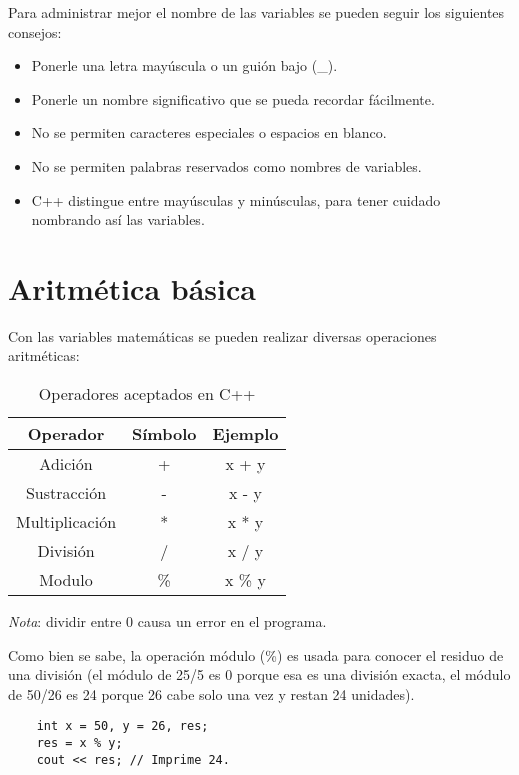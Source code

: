 Para administrar mejor el nombre de las variables se pueden seguir los siguientes consejos:
\begin{itemize}
    \item Ponerle una letra mayúscula o un guión bajo (\_).
    \item Ponerle un nombre significativo que se pueda recordar fácilmente.
    \item No se permiten caracteres especiales o espacios en blanco.
    \item No se permiten palabras reservados como nombres de variables.
    \item C++ distingue entre mayúsculas y minúsculas, para tener cuidado nombrando así las variables.
\end{itemize}



\section{Aritmética básica}

Con las variables matemáticas se pueden realizar diversas operaciones aritméticas:
\begin{table}[H]
    \begin{center}
        \caption{Operadores aceptados en C++}
        \label{tab: 1}
        \begin{tabular}{c c c}
            \hline
            \textbf{Operador}&\textbf{Símbolo}&\textbf{Ejemplo} \\
            \hline
            Adición         & +     & x + y \\
            Sustracción     & -     & x - y \\
            Multiplicación  & *     & x * y \\
            División        & /     & x / y \\
            Modulo          & \%    & x \% y \\
            \hline
        \end{tabular}
    \end{center}
\end{table}

\textit{Nota}: dividir entre 0 causa un error en el programa.

Como bien se sabe, la operación módulo (\%) es usada para conocer el residuo de una división (el módulo de 25/5 es 0 porque esa es una división exacta, el módulo de 50/26 es 24 porque 26 cabe solo una vez y restan 24 unidades).
\begin{lstlisting}
    int x = 50, y = 26, res;
    res = x % y;
    cout << res; // Imprime 24.
\end{lstlisting}

